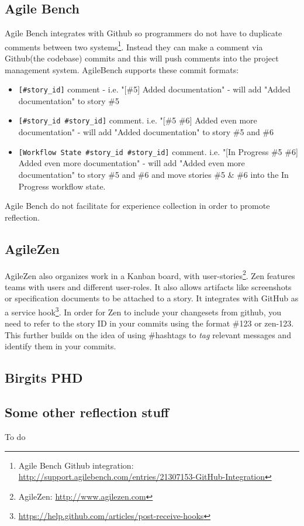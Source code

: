 \subsection*{Agile Bench}
Agile Bench integrates with Github so programmers do not have to duplicate comments between two systems\footnote{Agile Bench Github integration: \url{http://support.agilebench.com/entries/21307153-GitHub-Integration}}. Instead they can make a comment via Github(the codebase) commits and this will push comments into the project management system. AgileBench supports these commit formats:
\begin{itemize}
\item \verb|[#story_id]| comment - i.e. "[\#5] Added documentation" - will add "Added documentation" to story \#5
\item \verb|[#story_id #story_id]| comment. i.e. "[\#5 \#6] Added even more documentation" - will add "Added documentation" to story \#5 and \#6
\item \verb|[Workflow State #story_id #story_id]| comment. i.e. "[In Progress \#5 \#6] Added even more documentation" - will add "Added even more documentation" to story \#5 and \#6 and move stories \#5 \& \#6 into the In Progress workflow state.
\end{itemize}
Agile Bench do not facilitate for experience collection in order to promote reflection.
\subsection*{AgileZen}
AgileZen also organizes work in a Kanban board, with user-stories\footnote{AgileZen: \url{http://www.agilezen.com}}. Zen features teams with users and different user-roles. It also allows artifacts like screenshots or specification documents to be attached to a story. It integrates with GitHub as a service hook\footnote{\url{https://help.github.com/articles/post-receive-hooks}}. In order for Zen to include your changesets from github, you need to refer to the story ID in your commits using the format \#123 or zen-123. This further builds on the idea of using \#hashtags to \textit{tag} relevant messages and identify them in your commits. 

\subsection{Birgits PHD}

\subsection{Some other reflection stuff}
To do
